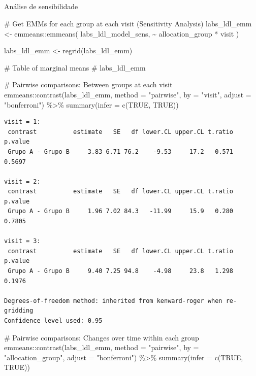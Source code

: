 \documentclass[
  12pt,
]{article}
\makeatletter
\let\oldsubparagraph\subparagraph
\renewcommand{\subparagraph}{
    \@ifstar
      \xxxSubParagraphStar
      \xxxSubParagraphNoStar
  }
\newcommand{\xxxSubParagraphStar}[1]{\oldsubparagraph*{#1}\mbox{}}
\newcommand{\xxxSubParagraphNoStar}[1]{\oldsubparagraph{#1}\mbox{}}
\newenvironment{Shaded}{\begin{snugshade}}{\end{snugshade}}
\newcommand{\AttributeTok}[1]{\textcolor[rgb]{0.40,0.45,0.13}{#1}}
\newcommand{\CommentTok}[1]{\textcolor[rgb]{0.37,0.37,0.37}{#1}}
\newcommand{\ConstantTok}[1]{\textcolor[rgb]{0.56,0.35,0.01}{#1}}
\newcommand{\FunctionTok}[1]{\textcolor[rgb]{0.28,0.35,0.67}{#1}}
\newcommand{\NormalTok}[1]{\textcolor[rgb]{0.00,0.23,0.31}{#1}}
\newcommand{\OtherTok}[1]{\textcolor[rgb]{0.00,0.23,0.31}{#1}}
\newcommand{\SpecialCharTok}[1]{\textcolor[rgb]{0.37,0.37,0.37}{#1}}
\newcommand{\StringTok}[1]{\textcolor[rgb]{0.13,0.47,0.30}{#1}}
\makeatother
\begin{document}
\subparagraph{Análise de
sensibilidade}\label{anuxe1lise-de-sensibilidade-5}

\begin{Shaded}
\begin{Highlighting}[]
\CommentTok{\# Get EMMs for each group at each visit (Sensitivity Analysis)}
\NormalTok{labs\_ldl\_emm }\OtherTok{\textless{}{-}}\NormalTok{ emmeans}\SpecialCharTok{::}\FunctionTok{emmeans}\NormalTok{(}
\NormalTok{    labs\_ldl\_model\_sens, }
    \SpecialCharTok{\textasciitilde{}}\NormalTok{ allocation\_group }\SpecialCharTok{*}\NormalTok{ visit}
\NormalTok{)}

\NormalTok{labs\_ldl\_emm }\OtherTok{\textless{}{-}} \FunctionTok{regrid}\NormalTok{(labs\_ldl\_emm)}

\CommentTok{\# Table of marginal means}
\CommentTok{\# labs\_ldl\_emm}

\CommentTok{\# Pairwise comparisons: Between groups at each visit}
\NormalTok{emmeans}\SpecialCharTok{::}\FunctionTok{contrast}\NormalTok{(labs\_ldl\_emm,}
\AttributeTok{method =} \StringTok{"pairwise"}\NormalTok{, }\AttributeTok{by =} \StringTok{"visit"}\NormalTok{,}
\AttributeTok{adjust =} \StringTok{"bonferroni"}\NormalTok{) }\SpecialCharTok{\%\textgreater{}\%} \FunctionTok{summary}\NormalTok{(}\AttributeTok{infer =} \FunctionTok{c}\NormalTok{(}\ConstantTok{TRUE}\NormalTok{, }\ConstantTok{TRUE}\NormalTok{))}
\end{Highlighting}
\end{Shaded}

\begin{verbatim}
visit = 1:
 contrast          estimate   SE   df lower.CL upper.CL t.ratio p.value
 Grupo A - Grupo B     3.83 6.71 76.2    -9.53     17.2   0.571  0.5697

visit = 2:
 contrast          estimate   SE   df lower.CL upper.CL t.ratio p.value
 Grupo A - Grupo B     1.96 7.02 84.3   -11.99     15.9   0.280  0.7805

visit = 3:
 contrast          estimate   SE   df lower.CL upper.CL t.ratio p.value
 Grupo A - Grupo B     9.40 7.25 94.8    -4.98     23.8   1.298  0.1976

Degrees-of-freedom method: inherited from kenward-roger when re-gridding 
Confidence level used: 0.95 
\end{verbatim}

\begin{Shaded}
\begin{Highlighting}[]
\CommentTok{\# Pairwise comparisons: Changes over time within each group}
\NormalTok{emmeans}\SpecialCharTok{::}\FunctionTok{contrast}\NormalTok{(labs\_ldl\_emm,}
\AttributeTok{method =} \StringTok{"pairwise"}\NormalTok{, }\AttributeTok{by =} \StringTok{"allocation\_group"}\NormalTok{,}
\AttributeTok{adjust =} \StringTok{"bonferroni"}\NormalTok{) }\SpecialCharTok{\%\textgreater{}\%} \FunctionTok{summary}\NormalTok{(}\AttributeTok{infer =} \FunctionTok{c}\NormalTok{(}\ConstantTok{TRUE}\NormalTok{, }\ConstantTok{TRUE}\NormalTok{))}
\end{Highlighting}
\end{Shaded}
\end{document}
